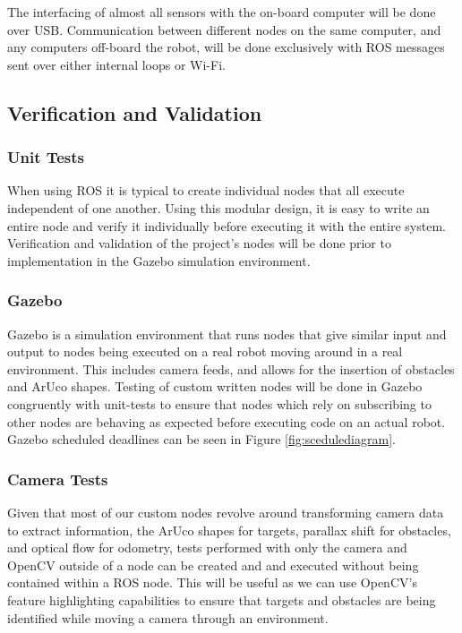 \documentclass{article}
\begin{document}
	The interfacing of almost all sensors with the on-board computer will be done over USB. Communication between different nodes on the same computer, and any computers off-board the robot, will be done exclusively with ROS messages sent over either internal loops or Wi-Fi.

	\subsection{Verification and Validation}
	
	\subsubsection{Unit Tests}
	
	When using ROS it is typical to create individual nodes that all execute independent of one another. Using this modular design, it is easy to write an entire node and verify it individually before executing it with the entire system.	Verification and validation of the project's nodes will be done prior to implementation in the Gazebo simulation environment.
	
	\subsubsection{Gazebo}
	
	Gazebo is a simulation environment that runs nodes that give similar input and output to nodes being executed on a real robot moving around in a real environment. This includes camera feeds, and allows for the insertion of obstacles and ArUco shapes. Testing of custom written nodes will be done in Gazebo congruently with unit-tests to ensure that nodes which rely on subscribing to other nodes are behaving as expected before executing code on an actual robot. Gazebo scheduled deadlines can be seen in Figure \ref{fig:scedulediagram}.
	
	\subsubsection{Camera Tests}
	
	Given that most of our custom nodes revolve around transforming camera data to extract information, the ArUco shapes for targets, parallax shift for obstacles, and optical flow for odometry, tests performed with only the camera and OpenCV outside of a node can be created and and executed without being contained within a ROS node. This will be useful as we can use OpenCV's feature highlighting capabilities to ensure that targets and obstacles are being identified while moving a camera through an environment. 
	
\end{document}
